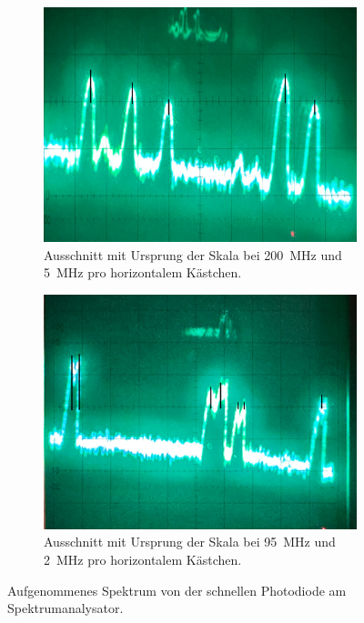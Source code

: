 \documentclass{article}
\begin{document}
\begin{figure}[h]
  \begin{subfigure}{0.49\textwidth}
    \centering
    \includegraphics[width=\textwidth]{spectrum1}
    \caption{Ausschnitt mit Ursprung der Skala bei \SI{200}{\MHz} und \SI{5}{\MHz}
      pro horizontalem Kästchen.}
    \label{fig:spectrum1}
  \end{subfigure}
  \hfill
  \begin{subfigure}{0.49\textwidth}
    \centering
    \includegraphics[width=\textwidth]{spectrum2}
    \caption{Ausschnitt mit Ursprung der Skala bei \SI{95}{\MHz} und \SI{2}{\MHz}
      pro horizontalem Kästchen.}
    \label{fig:spectrum2}
  \end{subfigure}
  \caption{Aufgenommenes Spektrum von der schnellen Photodiode am Spektrumanalysator.}
  \label{fig:spectrum}
\end{figure}
\end{document}
